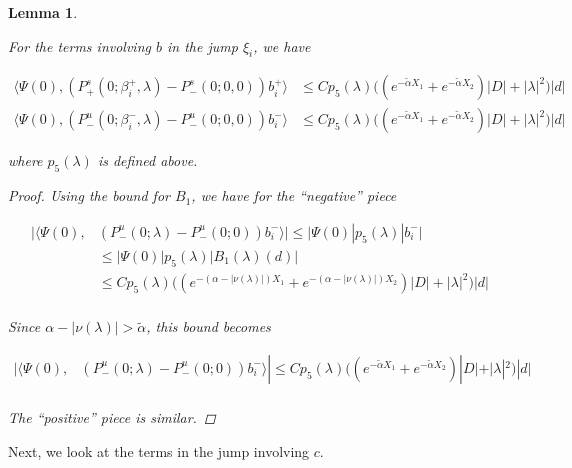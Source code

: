 \documentclass[12pt]{article}
\newtheorem{lemma}{Lemma}
\begin{document}
\begin{lemma}\label{jumpb}

For the terms involving $b$ in the jump $\xi_i$, we have

\begin{align*}
\langle \Psi(0), (P^s_+(0; \beta_i^+, \lambda) - P^s_-(0; 0, 0))b_i^+ \rangle
&\leq C p_5(\lambda) \Big( (e^{-\tilde{\alpha} X_1}+e^{-\tilde{\alpha} X_2})|D| + |\lambda|^2 \Big)|d|\\
\langle \Psi(0), (P^u_-(0; \beta_i^-, \lambda) - P^u_-(0; 0, 0))b_i^- \rangle
&\leq C p_5(\lambda)\Big( (e^{-\tilde{\alpha} X_1}+e^{-\tilde{\alpha} X_2})|D| + |\lambda|^2 \Big)|d|
\end{align*}

where $p_5(\lambda)$ is defined above.

\begin{proof}

Using the bound for $B_1$, we have for the ``negative'' piece

\begin{align*}
|\langle \Psi(0), &(P^u_-(0; \lambda) - P^u_-(0; 0))b_i^- \rangle|
\leq |\Psi(0)| p_5(\lambda)|b_i^-| \\
&\leq |\Psi(0)| p_5(\lambda)|B_1(\lambda)(d)| \\
&\leq C p_5(\lambda) \Big( (e^{-(\alpha - |\nu(\lambda)|) X_1} 
+ e^{-(\alpha - |\nu(\lambda)|) X_2}) |D| + |\lambda|^2 \Big)|d|\\
\end{align*}

Since $\alpha - |\nu(\lambda)| > \tilde{\alpha}$, this bound becomes

\begin{align*}
|\langle \Psi(0), &(P^u_-(0; \lambda) - P^u_-(0; 0))b_i^- \rangle|
\leq C p_5(\lambda) \Big( (e^{-\tilde{\alpha} X_1} + e^{-\tilde{\alpha} X_2}) |D| + |\lambda|^2 \Big)|d|\\
\end{align*}

The ``positive'' piece is similar.

\end{proof}
\end{lemma}

Next, we look at the terms in the jump involving $c$.

\end{document}
